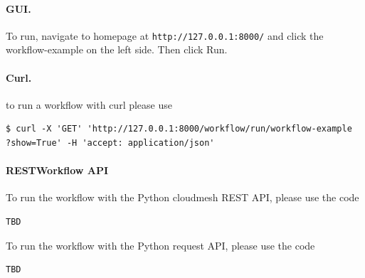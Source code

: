 \paragraph{GUI.} To run, navigate to homepage at
\texttt{http://127.0.0.1:8000/} and click the workflow-example on the
left side. Then click Run.


\paragraph{Curl.} to run a workflow with curl please use

\begin{verbatim}
$ curl -X 'GET' 'http://127.0.0.1:8000/workflow/run/workflow-example
?show=True' -H 'accept: application/json'
\end{verbatim}%

\paragraph{RESTWorkflow API}

To run the workflow with the Python cloudmesh REST API, please use the code

\begin{verbatim} 
TBD
\end{verbatim}

 To run the workflow with the Python
request API, please use the code

\begin{verbatim}
TBD
\end{verbatim}






